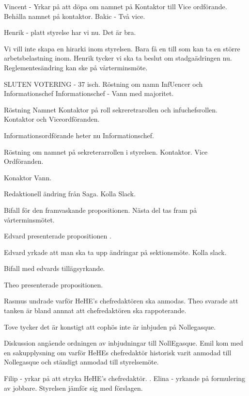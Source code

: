 \documentclass[10pt]{article}
\begin{document}
\begin{paragrafer}
\begin{paragrafer}
      Vincent - Yrkar på att döpa om namnet på Kontaktor till Vice ordförande. Behålla namnet på kontaktor. 
      Bakic - Två vice. 

      Henrik - platt styrelse har vi nu. Det är bra. 

      
      Vi vill inte skapa en hirarki inom styrelsen. Bara få en till som kan ta en större arbetsbelastning inom. 
      Henrik tycker vi ska ta beslut om stadgaädringen nu. Reglementesändring kan ske på vårterminsmöte. 

      SLUTEN VOTERING - 37 isch. 
      Röstning om namn InfUencer och Informationschef
      Informationschef - Vann med majoritet. 

      Röstning Namnet Kontaktor på roll
      sekreretrarollen och infuchefsrollen. 
      Kontaktor och Viceordföranden. 

      Informationsordförande heter nu Informationschef.
      
      Röstning om namnet på sekreterarrollen i styrelsen. 
      Kontaktor.
      Vice Ordföranden. 

      Konaktor Vann. 

      Redaktionell ändring från Saga. Kolla Slack.

      Bifall för den framvaskande propositionen. Nästa del tas fram på vårterminsmötet. 

        Edvard presenterade propositionen .


        Edvard yrkade att man ska ta upp ändringar på sektionsmöte. Kolla slack. 

        Bifall med edvards tillägsyrkande. 


        Theo presenterade propositionen. 

        Rasmus undrade varför HeHE's chefredaktören ska anmodas. Theo svarade att tanken är bland annnat att chefredaktören ska rappoterande. 

        Tove tycker det är konstigt att cophös inte är inbjuden på Nollegasque. 

        Diskussion angående ordningen av inbjudningar till NollEgasque. 
        Emil kom med en sakupplysning om varför HeHEs chefredaktör historisk varit anmodad till Nollegasque och ständigt anmodad till styrelsemöte. 

        Filip - yrkar på att stryka HeHE's chefredaktör. . 
        Elina - yrkande på formulering av jobbare. Styrelsen jämför sig med förslagen. 
         

\end{paragrafer}
\end{paragrafer}
\end{document}
